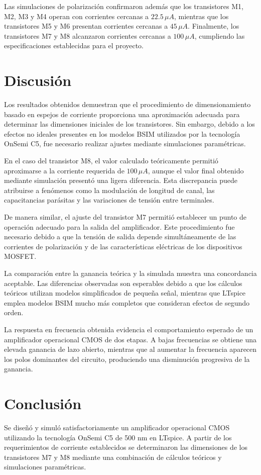 \documentclass[journal]{IEEEtran}
\begin{document}
Las simulaciones de polarización confirmaron además que los transistores M1, M2, M3 y M4 operan con corrientes cercanas a $22.5\,\mu A$, mientras que los transistores M5 y M6 presentan corrientes cercanas a $45\,\mu A$. Finalmente, los transistores M7 y M8 alcanzaron corrientes cercanas a $100\,\mu A$, cumpliendo las especificaciones establecidas para el proyecto.
\section{Discusión}
Los resultados obtenidos demuestran que el procedimiento de dimensionamiento basado en espejos de corriente proporciona una aproximación adecuada para determinar las dimensiones iniciales de los transistores. Sin embargo, debido a los efectos no ideales presentes en los modelos BSIM utilizados por la tecnología OnSemi C5, fue necesario realizar ajustes mediante simulaciones paramétricas.

En el caso del transistor M8, el valor calculado teóricamente permitió aproximarse a la corriente requerida de $100\,\mu A$, aunque el valor final obtenido mediante simulación presentó una ligera diferencia. Esta discrepancia puede atribuirse a fenómenos como la modulación de longitud de canal, las capacitancias parásitas y las variaciones de tensión entre terminales.

De manera similar, el ajuste del transistor M7 permitió establecer un punto de operación adecuado para la salida del amplificador. Este procedimiento fue necesario debido a que la tensión de salida depende simultáneamente de las corrientes de polarización y de las características eléctricas de los dispositivos MOSFET.

La comparación entre la ganancia teórica y la simulada muestra una concordancia aceptable. Las diferencias observadas son esperables debido a que los cálculos teóricos utilizan modelos simplificados de pequeña señal, mientras que LTspice emplea modelos BSIM mucho más completos que consideran efectos de segundo orden.

La respuesta en frecuencia obtenida evidencia el comportamiento esperado de un amplificador operacional CMOS de dos etapas. A bajas frecuencias se obtiene una elevada ganancia de lazo abierto, mientras que al aumentar la frecuencia aparecen los polos dominantes del circuito, produciendo una disminución progresiva de la ganancia.

\section{Conclusión}
Se diseñó y simuló satisfactoriamente un amplificador operacional CMOS utilizando la tecnología OnSemi C5 de 500 nm en LTspice. A partir de los requerimientos de corriente establecidos se determinaron las dimensiones de los transistores M7 y M8 mediante una combinación de cálculos teóricos y simulaciones paramétricas.
\end{document}
